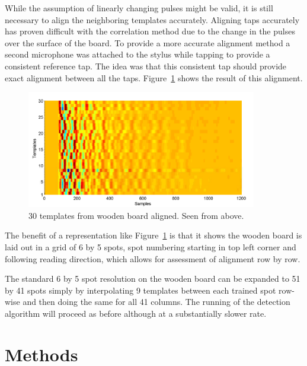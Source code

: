 While the assumption of linearly changing pulses might be valid, it is still necessary to align the neighboring templates accurately. Aligning taps accurately has proven difficult with the correlation method due to the change in the pulses over the surface of the board. To provide a more accurate alignment method a second microphone was attached to the stylus while tapping to provide a consistent reference tap. The idea was that this consistent tap should provide exact alignment between all the taps. Figure~\ref{fig:templatesAligned} shows the result of this alignment.

\begin{figure}[!]
\centering
\includegraphics[width=380px]{templatesAligned.pdf}
\caption{30 templates from wooden board aligned. Seen from above.}\label{fig:templatesAligned}
\end{figure}

The benefit of a representation like Figure~\ref{fig:templatesAligned} is that it shows the wooden board is laid out in a grid of 6 by 5 spots, spot numbering starting in top left corner and following reading direction, which allows for assessment of alignment row by row.

The standard 6 by 5 spot resolution on the wooden board can be expanded to 51 by 41 spots simply by interpolating 9 templates between each trained spot row-wise and then doing the same for all 41 columns. The running of the detection algorithm will proceed as before although at a substantially slower rate.

\section{Methods}
